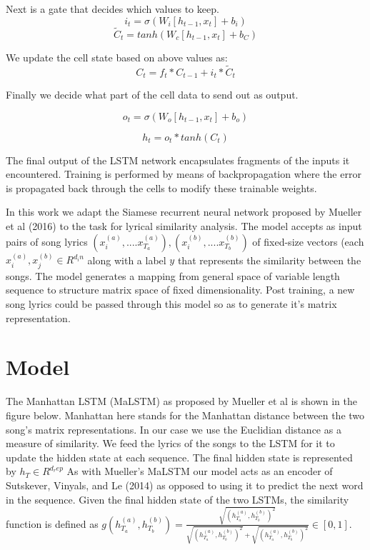 \documentclass[11pt]{article}
\begin{document}
Next is a gate that decides which values to keep.
\[ i_t=\sigma(W_i[h_{t-1},x_t] + b_i)\]
\[ \tilde{C}_t = tanh(W_c[h_{t-1},x_t] + b_C)\]

We update the cell state based on above values as:
\[ C_t=f_t*C_{t-1} + i_t*\tilde{C}_t \]

Finally we decide what part of the cell data to send out as output.

\[ o_t= \sigma (W_o[h_{t-1}, x_t] + b_o) \]

\[ h_t=o_t*tanh(C_t) \]

The final output of the LSTM network encapsulates fragments of the 
inputs it encountered. Training is performed by means of backpropagation
where the error is propagated back through the cells to modify these
trainable weights.

In this work we adapt the Siamese recurrent neural network proposed by
Mueller et al (2016) to the task for lyrical similarity analysis. The
model accepts as input pairs of song lyrics $(x^{(a)}_{i},....x^{(a)}_{T_a}),
(x^(b)_{i},....x^(b)_{T_b})$ of fixed-size vectors (each $x^{(a)}_i,x^{(b)}_j
\in R^{d_in}$ along with a label $y$ that represents the similarity 
between the songs. The model generates a mapping from general space of 
variable length sequence to structure matrix space of fixed dimensionality.
Post training, a new song lyrics could be passed through this model so
as to generate it's matrix representation.



\section{Model}
The Manhattan LSTM (MaLSTM) as proposed by Mueller et al is shown in the 
figure below. Manhattan here stands for the Manhattan distance between 
the two song's matrix representations. In our case we use the 
Euclidian distance as a measure of similarity. We feed the lyrics of
the songs to the LSTM for it to update the hidden state at each sequence.
The final hidden state is represented by $h_T \in R^{d_rep}$
As with Mueller's MaLSTM our model acts as an encoder of Sutskever,
Vinyals, and Le (2014) as opposed to using it to predict the next word 
in the sequence. Given the final hidden state of the two LSTMs, the 
similarity function is defined as $g(h^{(a)}_{T_a}, h^{(b)}_{T_b}) = 
\frac{\sqrt{(h^{(a)}_{T_a}, h^{(b)}_{T_b})^2}}{\sqrt{(h^{(a)}_{T_a}, h^{(b)}_{T_b})^2} + \sqrt{(h^{(a)}_{T_a}, h^{(b)}_{T_b})^2}} \in [0,1]$.
\end{document}

